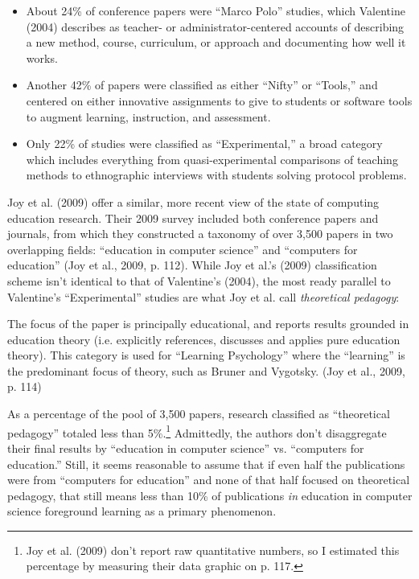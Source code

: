\begin{itemize}
\item
  About 24\% of conference papers were ``Marco Polo'' studies, which
  Valentine (2004) describes as teacher- or administrator-centered
  accounts of describing a new method, course, curriculum, or approach
  and documenting how well it works.
\item
  Another 42\% of papers were classified as either ``Nifty'' or
  ``Tools,'' and centered on either innovative assignments to give to
  students or software tools to augment learning, instruction, and
  assessment.
\item
  Only 22\% of studies were classified as ``Experimental,'' a broad
  category which includes everything from quasi-experimental comparisons
  of teaching methods to ethnographic interviews with students solving
  protocol problems.
\end{itemize}

Joy et al. (2009) offer a similar, more recent view of the state of
computing education research. Their 2009 survey included both conference
papers and journals, from which they constructed a taxonomy of over
3,500 papers in two overlapping fields: ``education in computer
science'' and ``computers for education'' (Joy et al., 2009, p. 112).
While Joy et al.'s (2009) classification scheme isn't identical to that
of Valentine's (2004), the most ready parallel to Valentine's
``Experimental'' studies are what Joy et al. call \emph{theoretical
pedagogy}:

The focus of the paper is principally educational, and reports results
grounded in education theory (i.e. explicitly references, discusses and
applies pure education theory). This category is used for ``Learning
Psychology'' where the ``learning'' is the predominant focus of theory,
such as Bruner and Vygotsky. (Joy et al., 2009, p. 114)

As a percentage of the pool of 3,500 papers, research classified as
``theoretical pedagogy'' totaled less than 5\%.\footnote{Joy et al.
  (2009) don't report raw quantitative numbers, so I estimated this
  percentage by measuring their data graphic on p. 117.} Admittedly, the
authors don't disaggregate their final results by ``education in
computer science'' vs. ``computers for education.'' Still, it seems
reasonable to assume that if even half the publications were from
``computers for education'' and none of that half focused on theoretical
pedagogy, that still means less than 10\% of publications \emph{in}
education in computer science foreground learning as a primary
phenomenon.

